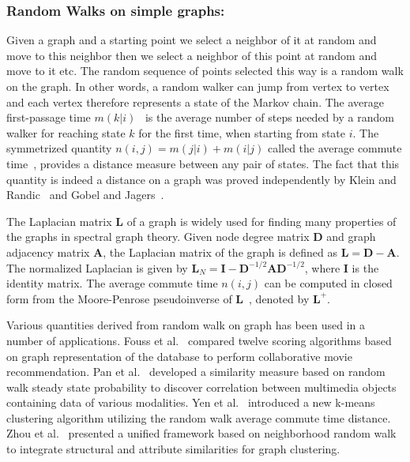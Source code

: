 \subsubsection{Random Walks on simple graphs:}
Given a graph and a starting point we select a neighbor of it at random and move to this neighbor then we select a neighbor of this point at random and move to it etc. The random sequence of points selected this way is a random walk on the graph. In other words, a random walker can jump from vertex to vertex and each vertex therefore represents a state of the Markov chain. The average first-passage time $m(k|i)$~\cite{randomwalks} is the average number of steps needed by a random walker for reaching state $k$ for the first time, when starting from state $i$. The symmetrized quantity $n(i,j)=m(j|i)+m(i|j)$ called the average commute time~\cite{randomwalks}, provides a distance measure between any pair of states. The fact that this quantity is indeed a distance on a graph was proved independently by Klein and Randic~\cite{Klein} and Gobel and Jagers~\cite{Gobel}.

The Laplacian matrix $\mathbf{L}$ of a graph is widely used for finding many properties of the graphs in spectral graph theory. Given node degree matrix $\mathbf{D}$ and graph adjacency matrix $\mathbf{A}$, the Laplacian matrix of the graph is defined as $\mathbf{L}=\mathbf{D}-\mathbf{A}$. The normalized Laplacian is given by $\mathbf{L}_N=\mathbf{I}-\mathbf{D}^{-1/2}\mathbf{A}\mathbf{D}^{-1/2}$, where $\mathbf{I}$ is the identity matrix. The average commute time $n(i,j)$ can be computed in closed form from the Moore-Penrose pseudoinverse of $\mathbf{L}$~\cite{pseudo}, denoted by $\mathbf{L}^+$.

Various quantities derived from random walk on graph has been used in a number of applications. Fouss et al.~\cite{Fouss06random-walkcomputation} compared twelve scoring algorithms based on graph representation of the database to perform collaborative movie recommendation. Pan et al.~\cite{Pan} developed a similarity measure based on random walk steady state probability to discover correlation between multimedia objects containing data of various modalities. Yen et al.~\cite{Yen05clusteringusing} introduced a new k-means clustering algorithm utilizing the random walk average commute time distance. Zhou et al.~\cite{Zhou:2009:GCB:1687627.1687709} presented a unified framework based on neighborhood random walk to integrate structural and attribute similarities for graph clustering.



